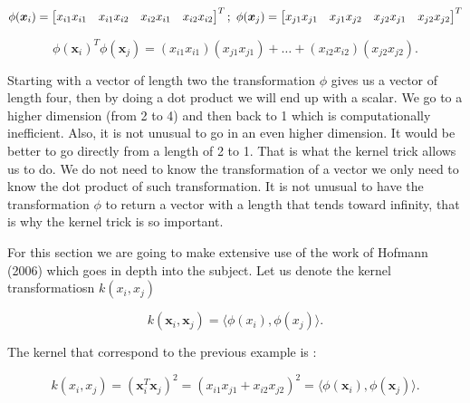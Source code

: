 \documentclass[a4paper,12pt]{article}
\numberwithin{equation}{section}
\begin{document}
\begin{equation*}
 \phi(\boldsymbol{x}_i)=
 \begin{bmatrix}
    x_{i1}x_{i1}    & x_{i1}x_{i2} & x_{i2}x_{i1} & x_{i2}x_{i2}\\

 \end{bmatrix}^T; \\
  \mbox{ }
  \phi(\boldsymbol{x}_j)=
 \begin{bmatrix}  
    x_{j1}x_{j1}    & x_{j1}x_{j2} & x_{j2}x_{j1} & x_{j2}x_{j2}\\

 \end{bmatrix}^T
\end{equation*}

\begin{equation*}
\phi(\boldsymbol{x}_i)^T\phi(\boldsymbol{x}_j) = (x_{i1}x_{i1})(x_{j1}x_{j1}) + \dots + (x_{i2}x_{i2})(x_{j2}x_{j2}).
\end{equation*}

Starting with a vector of length two the transformation $\phi$ gives us a vector of length four, then by doing a dot product we will end up with a scalar. We go to a higher dimension (from 2 to 4) and then back to 1 which is computationally inefficient. Also, it is not unusual to go in an even higher dimension. It would be better to go directly from a length of 2 to 1. That is what the kernel trick allows us to do. We do not need to know the transformation of a vector we only need to know the dot product of such transformation. It is not unusual to have the transformation $\phi$ to return a vector with a length that tends toward infinity, that is why the kernel trick is so important.

For this section we are going to make extensive use of the work of Hofmann (2006) which goes in depth into the subject. Let us denote the kernel transformatiosn $k(x_i,x_j)$

\begin{equation*}
 k(\boldsymbol{x}_i,\boldsymbol{x}_j) = \langle \phi(x_i),\phi(x_j) \rangle.
\end{equation*}

The kernel that correspond to the previous example is :

\begin{equation*}
 k(x_i,x_j) = (\boldsymbol{x}^T_i\boldsymbol{x}_j)^2 = (x_{i1}x_{j1} + x_{i2}x_{j2})^2 =  \langle \phi(\boldsymbol{x}_i),\phi(\boldsymbol{x}_j) \rangle.
\end{equation*}
\end{document}

